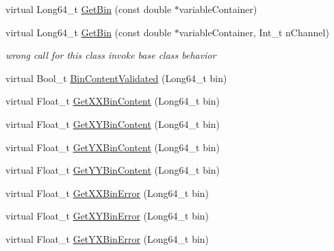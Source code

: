 \begin{DoxyCompactItemize}
virtual Long64\+\_\+t \mbox{\hyperlink{classQn_1_1CorrectionProfileCorrelationComponents_a0e45d5f8e12af86c557aad48e07198a4}{Get\+Bin}} (const double $\ast$variable\+Container)
\item 
\mbox{\label{classQn_1_1CorrectionProfileCorrelationComponents_a743cd351750d847bfc638d15218cbfa8}} 
virtual Long64\+\_\+t \mbox{\hyperlink{classQn_1_1CorrectionProfileCorrelationComponents_a743cd351750d847bfc638d15218cbfa8}{Get\+Bin}} (const double $\ast$variable\+Container, Int\+\_\+t n\+Channel)
\begin{DoxyCompactList}\small\item\em wrong call for this class invoke base class behavior \end{DoxyCompactList}\item 
virtual Bool\+\_\+t \mbox{\hyperlink{classQn_1_1CorrectionProfileCorrelationComponents_a10db27a0f3bc8c52b3b188eb7395f835}{Bin\+Content\+Validated}} (Long64\+\_\+t bin)
\item 
virtual Float\+\_\+t \mbox{\hyperlink{classQn_1_1CorrectionProfileCorrelationComponents_a8bb785420ac0cb117b2af1047cb86bb2}{Get\+X\+X\+Bin\+Content}} (Long64\+\_\+t bin)
\item 
virtual Float\+\_\+t \mbox{\hyperlink{classQn_1_1CorrectionProfileCorrelationComponents_ad690503e78ddf4017cd8813bb12e8583}{Get\+X\+Y\+Bin\+Content}} (Long64\+\_\+t bin)
\item 
virtual Float\+\_\+t \mbox{\hyperlink{classQn_1_1CorrectionProfileCorrelationComponents_a5bf66dc908aa51c9b7661a69023dd946}{Get\+Y\+X\+Bin\+Content}} (Long64\+\_\+t bin)
\item 
virtual Float\+\_\+t \mbox{\hyperlink{classQn_1_1CorrectionProfileCorrelationComponents_a6af717d8880002afe43b294f1a152546}{Get\+Y\+Y\+Bin\+Content}} (Long64\+\_\+t bin)
\item 
virtual Float\+\_\+t \mbox{\hyperlink{classQn_1_1CorrectionProfileCorrelationComponents_a76bba719fcab0995255c8309dcaf6c72}{Get\+X\+X\+Bin\+Error}} (Long64\+\_\+t bin)
\item 
virtual Float\+\_\+t \mbox{\hyperlink{classQn_1_1CorrectionProfileCorrelationComponents_a58d233f34fbbf505d6abb2cf3236c60f}{Get\+X\+Y\+Bin\+Error}} (Long64\+\_\+t bin)
\item 
virtual Float\+\_\+t \mbox{\hyperlink{classQn_1_1CorrectionProfileCorrelationComponents_a91f05094196842c16be6f6fc2bb7dad8}{Get\+Y\+X\+Bin\+Error}} (Long64\+\_\+t bin)
\item 

\end{DoxyCompactItemize}
